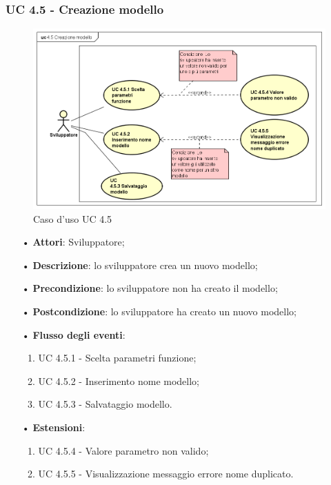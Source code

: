 \subsubsection{UC 4.5 - Creazione modello}
\begin{figure}[H]
\centering
\includegraphics[width=17cm]{img/UC450.png} 
\caption{Caso d'uso UC 4.5}\label{fig:450}
\end{figure}
\begin{itemize}
\item[•]\textbf{Attori}: Sviluppatore;
\item[•]\textbf{Descrizione}: lo sviluppatore crea un nuovo modello;
\item[•]\textbf{Precondizione}: lo sviluppatore non ha creato il modello;
\item[•]\textbf{Postcondizione}: lo sviluppatore ha creato un nuovo modello;
\item[•]\textbf{Flusso degli eventi}:  
\begin{enumerate}
	\item UC 4.5.1 - Scelta parametri funzione;
	\item UC 4.5.2 - Inserimento nome modello;
	\item UC 4.5.3 - Salvataggio modello.
\end{enumerate}
\item[•]\textbf{Estensioni}:  
\begin{enumerate}
	\item UC 4.5.4 - Valore parametro non valido;
	\item UC 4.5.5 - Visualizzazione messaggio errore nome duplicato.
\end{enumerate}
\end{itemize}


